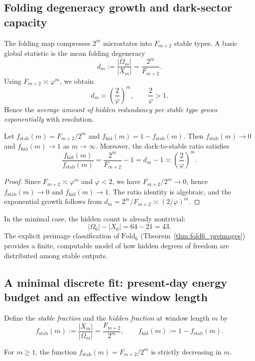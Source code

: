 \subsection{Folding degeneracy growth and dark-sector capacity}
\label{subsec:degeneracy_growth}

The folding map compresses $2^m$ microstates into $F_{m+2}$ stable types.
A basic global statistic is the mean folding degeneracy
\[
d_m:=\frac{|\Omega_m|}{|X_m|}=\frac{2^m}{F_{m+2}}.
\]
Using $F_{m+2}\asymp \varphi^{m}$, we obtain
\[
d_m\asymp \left(\frac{2}{\varphi}\right)^m,
\qquad \frac{2}{\varphi}>1.
\]
Hence the \emph{average amount of hidden redundancy per stable type grows exponentially} with resolution.
\begin{proposition}
\label{prop:hidden_dominance}
Let $f_{\mathrm{stab}}(m)=F_{m+2}/2^m$ and $f_{\mathrm{hid}}(m)=1-f_{\mathrm{stab}}(m)$.
Then $f_{\mathrm{stab}}(m)\to 0$ and $f_{\mathrm{hid}}(m)\to 1$ as $m\to\infty$.
Moreover, the dark-to-stable ratio satisfies
\[
\frac{f_{\mathrm{hid}}(m)}{f_{\mathrm{stab}}(m)}=\frac{2^m}{F_{m+2}}-1=d_m-1\asymp \left(\frac{2}{\varphi}\right)^m.
\]
\end{proposition}

\begin{proof}
Since $F_{m+2}\asymp \varphi^m$ and $\varphi<2$, we have $F_{m+2}/2^m\to 0$, hence $f_{\mathrm{stab}}(m)\to 0$ and $f_{\mathrm{hid}}(m)\to 1$.
The ratio identity is algebraic, and the exponential growth follows from $d_m=2^m/F_{m+2}\asymp (2/\varphi)^m$.
\end{proof}

In the minimal case, the hidden count is already nontrivial:
\[
|\Omega_6|-|X_6|=64-21=43.
\]
The explicit preimage classification of $\mathrm{Fold}_6$ (Theorem~\ref{thm:fold6_preimages}) provides a finite, computable model of how hidden degrees of freedom are distributed among stable outputs.

\subsection{A minimal discrete fit: present-day energy budget and an effective window length}
\label{subsec:energy_budget_fit}

Define the \emph{stable fraction} and the \emph{hidden fraction} at window length $m$ by
\[
f_{\mathrm{stab}}(m):=\frac{|X_m|}{|\Omega_m|}=\frac{F_{m+2}}{2^m},
\qquad
f_{\mathrm{hid}}(m):=1-f_{\mathrm{stab}}(m).
\]
\begin{lemma}
\label{lem:f_stab_monotone}
For $m\ge 1$, the function $f_{\mathrm{stab}}(m)=F_{m+2}/2^m$ is strictly decreasing in $m$.
\end{lemma}

